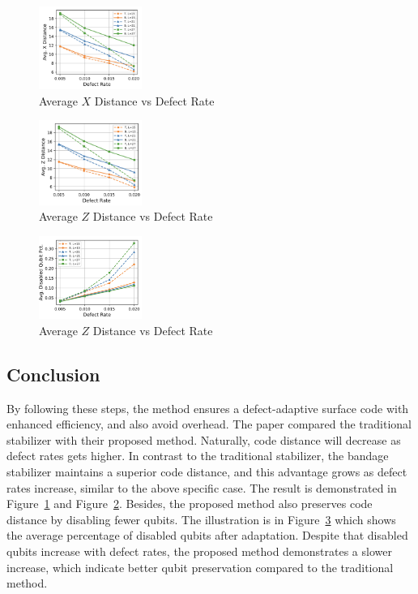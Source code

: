 \begin{figure}[ht]
    \centering
    \includegraphics[width=0.3\textwidth]{sections/4_stabilizer/Fig3c.png}
    \caption{Average $X$ Distance vs Defect Rate}
    \label{fig:Fig3c}
\end{figure}

\begin{figure}[ht]
    \centering
    \includegraphics[width=0.3\textwidth]{sections/4_stabilizer/Fig3d.png}
    \caption{Average $Z$ Distance vs Defect Rate}
    \label{fig:Fig3d}
\end{figure}

\begin{figure}[ht]
    \centering
    \includegraphics[width=0.3\textwidth]{sections/4_stabilizer/Fig3e.png}
    \caption{Average $Z$ Distance vs Defect Rate}
    \label{fig:Fig3e}
\end{figure}

\subsection{Conclusion}
By following these steps, the method ensures a defect-adaptive surface code with enhanced efficiency, and also avoid overhead. The paper compared the traditional stabilizer with their proposed method. Naturally, code distance will decrease as defect rates gets higher. In contrast to the traditional stabilizer, the bandage stabilizer maintains a superior code distance, and this advantage grows as defect rates increase, similar to the above specific case. The result is demonstrated in Figure~\ref{fig:Fig3c} and Figure~\ref{fig:Fig3d}. Besides, the proposed method also preserves code distance by disabling fewer qubits. The illustration is in Figure~\ref{fig:Fig3e} which shows the average percentage of disabled qubits after adaptation. Despite that disabled qubits increase with defect rates, the proposed method demonstrates a slower increase, which indicate better qubit preservation compared to the traditional method.